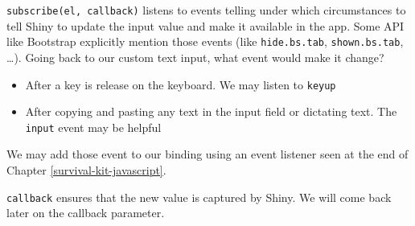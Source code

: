 \documentclass[]{book}
\newenvironment{Shaded}{\begin{snugshade}}{\end{snugshade}}
\newcommand{\AttributeTok}[1]{\textcolor[rgb]{0.77,0.63,0.00}{#1}}
\newcommand{\KeywordTok}[1]{\textcolor[rgb]{0.13,0.29,0.53}{\textbf{#1}}}
\newcommand{\NormalTok}[1]{#1}
\newcommand{\OperatorTok}[1]{\textcolor[rgb]{0.81,0.36,0.00}{\textbf{#1}}}
\newcommand{\StringTok}[1]{\textcolor[rgb]{0.31,0.60,0.02}{#1}}
\providecommand{\tightlist}{%
  \setlength{\itemsep}{0pt}\setlength{\parskip}{0pt}}
\begin{document}
\texttt{subscribe(el,\ callback)} listens to events telling under which circumstances to tell Shiny to update the input value and make it available in the app. Some API like Bootstrap explicitly mention those events (like \texttt{hide.bs.tab}, \texttt{shown.bs.tab}, \ldots{}).
Going back to our custom text input, what event would make it change?

\begin{itemize}
\tightlist
\item
  After a key is release on the keyboard. We may listen to \texttt{keyup}
\item
  After copying and pasting any text in the input field or dictating text. The \texttt{input} event may be helpful
\end{itemize}

We may add those event to our binding using an event listener seen at the end of Chapter \ref{survival-kit-javascript}.

\begin{Shaded}
\end{Shaded}

\texttt{callback} ensures that the new value is captured by Shiny. We will come back later on the callback parameter.
\end{document}
